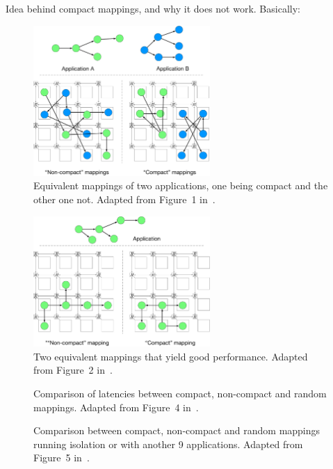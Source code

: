 Idea behind compact mappings, and why it does not work. Basically:\cite{goens_samos19}


\begin{figure}[th]
	\centering
	\includegraphics[width=0.6\textwidth]{figures/compact_intro.pdf}
	\caption{Equivalent mappings of two applications, one being compact and the other one not. Adapted from Figure~1 in~\cite{goens_samos19}.}
	\label{fig:compact_intro}
\end{figure}


\begin{figure}[th]
	\centering
	\includegraphics[width=0.6\textwidth]{figures/topology_vs_geometry.pdf}
	\caption{Two equivalent mappings that yield good performance. Adapted from Figure~2 in~\cite{goens_samos19}.}
	\label{fig:topology_vs_geometry}
\end{figure}


\begin{figure}[h]
	\centering
	\caption{Comparison of latencies between compact, non-compact and random mappings. Adapted from Figure~4 in~\cite{goens_samos19}.}
	\label{fig:compact_latency}
\end{figure}


\begin{figure}[h]
	\centering
	\caption{Comparison between compact, non-compact and random mappings running isolation or with another 9 applications. Adapted from Figure~5 in~\cite{goens_samos19}.}
	\label{fig:compact_cases}
\end{figure}